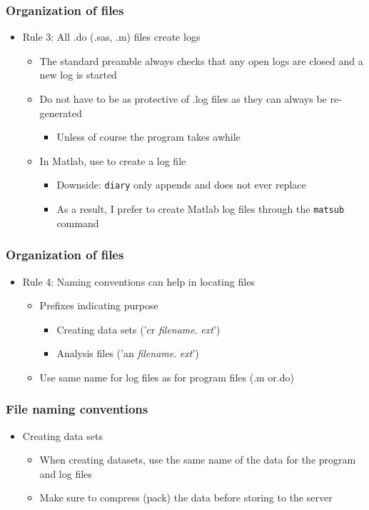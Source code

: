 \documentclass[english,xcolor=dvipsnames]{beamer}
\newcommand{\bi}{\begin{itemize}}
\newcommand{\ei}{\end{itemize}}
\begin{document}
\begin{frame}
\frametitle{Organization of files}

   \bi 
   \item Rule 3: All .do (.sas, .m) files create logs
      \bi 
      \item The standard preamble always checks that any open logs are closed and a new log is started
      \item Do not have to be as protective of .log files as they can always be re-generated
         \bi 
         \item Unless of course the program takes awhile
         \ei
      \item In Matlab, use  to create a log file
      	\bi
      	\item Downside: \texttt{diary} only appends and does not ever replace
      	\item As a result, I prefer to create Matlab log files through the \texttt{matsub} command
      	\ei
      \ei
   \ei
\end{frame}

\begin{frame}
\frametitle{Organization of files}

   \bi 
   \item Rule 4: Naming conventions can help in locating files
      \bi 
      \item Prefixes indicating purpose
         \bi 
         \item Creating data sets ('cr \emph{filename}.  \emph{ext}')
         \item Analysis files ('an \emph{filename}. \emph{ext}')
         \ei
      \item Use same name for log files as for program files (.m or.do)
      \ei
   \ei
\end{frame}

\begin{frame}
\frametitle{File naming conventions}

   \bi 
   \item Creating data sets
      \bi 
      \item When creating datasets, use the same name of the data for the program and log files
      \item Make sure to compress (pack) the data before storing to the server
      \ei
   \ei
\end{frame}
\end{document}

